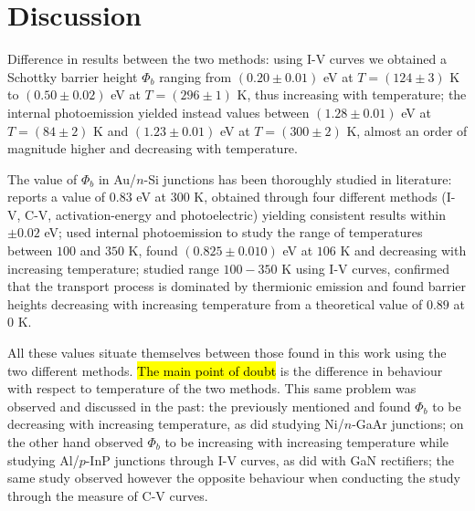 \newpage %

\section{Discussion}
Difference in results between the two methods:
using I-V curves we obtained a Schottky barrier height $\Phi_b$ ranging from $(0.20 \pm 0.01)$ eV at $T = (124 \pm 3)$ K to $(0.50 \pm 0.02)$ eV at $T = (296 \pm 1)$ K, thus increasing with temperature; 
the internal photoemission yielded instead values between $(1.28 \pm 0.01)$ eV at $T = (84 \pm 2)$ K and $(1.23 \pm 0.01)$ eV at $T = (300 \pm 2)$ K, almost an order of magnitude higher and decreasing with temperature.

The value of $\Phi_b$ in Au/$n$-Si junctions has been thoroughly studied in literature: 
\cite{sze_physics_2007} reports a value of $0.83$ eV at 300 K, obtained through four different methods (I-V, C-V, activation-energy and photoelectric) yielding consistent results within $\pm 0.02$ eV; 
\cite{crowell_equality_1964} used internal photoemission to study the range of temperatures between $100$ and $350$ K, found $(0.825 \pm 0.010)$ eV at $106$ K and decreasing with increasing temperature; 
\cite{arizumi_transport_1969} studied range $100-350$ K using I-V curves, confirmed that the transport process is dominated by thermionic emission and found barrier heights decreasing with increasing temperature from a theoretical value of $0.89$ at $0$ K.

All these values situate themselves between those found in this work using the two different methods. \hl{The main point of doubt} is the difference in behaviour with respect to temperature of the two methods.
This same problem was observed and discussed in the past:
the previously mentioned \cite{crowell_equality_1964} and \cite{arizumi_transport_1969} found $\Phi_b$ to be decreasing with increasing temperature, as did \cite{hackam_electrical_1972} studying Ni/$n$-GaAr junctions;
\cite{yildirim_temperature-dependent_2010} on the other hand observed $\Phi_b$ to be increasing with increasing temperature while studying Al/$p$-InP junctions through I-V curves, as did \cite{zhou_temperature-dependent_2007} with GaN rectifiers; the same study observed however the opposite behaviour when conducting the study through the measure of C-V curves.


